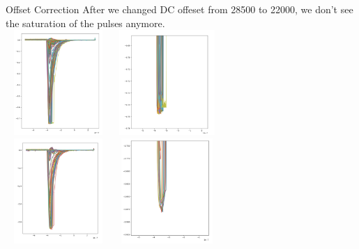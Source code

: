 \documentclass{beamer}
\begin{document}
\begin{frame}{Offset Correction}
After we changed DC offeset from 28500 to 22000, we don't see the saturation of the pulses anymore.\\
\centering
\includegraphics[width=4cm, height=4cm]{../btl_files/offset_plot/without_offset.png}
\includegraphics[width=4cm, height=4cm]{../btl_files/offset_plot/without_offset_zoom.png}\\
\includegraphics[width=4cm, height=4cm]{../btl_files/offset_plot/with_offset.png}
\includegraphics[width=4cm, height=4cm]{../btl_files/offset_plot/with_offset_zoom.png}\\
\end{frame}
\end{document}

